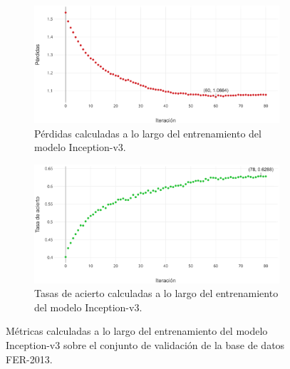 \begin{figure}
   \vspace{1cm}
    \begin{subfigure}[t]{\textwidth}
      \centering
      \includegraphics[width=\linewidth]{Images/Inception-v3_loss.png}
      \caption{Pérdidas calculadas a lo largo del entrenamiento del modelo Inception-v3.}
      \label{fig:Inception-v3_loss}
    \end{subfigure}
    
    \vspace{1cm}
    \begin{subfigure}[t]{\textwidth}
      \centering
      \includegraphics[width=\linewidth]{Images/Inception-v3_acc.png}
      \caption{Tasas de acierto calculadas a lo largo del entrenamiento del modelo Inception-v3.}
      \label{fig:Inception-v3_acc}
    \end{subfigure}
    \caption{Métricas calculadas a lo largo del entrenamiento del modelo Inception-v3 sobre el conjunto de validación de la base de datos FER-2013.}
    \label{fig:Inception-v3_metrics}
\end{figure}

